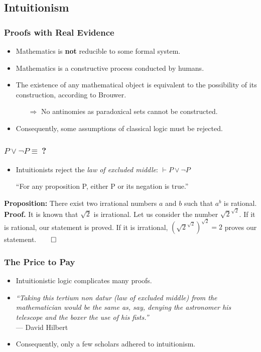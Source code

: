 \documentclass{beamer}
\begin{document}
\subsection{Intuitionism}
\begin{frame}
    \frametitle{Proofs with Real Evidence}
    \begin{itemize}[<+->]
	\item Mathematics is \textbf{not} reducible to some formal system.
	\item Mathematics is a constructive process conducted by humans.
	\item The existence of any mathematical object is equivalent to the possibility of its construction, according to Brouwer.
	\begin{itemize}
		\item[$\Rightarrow$] No antinomies as paradoxical sets cannot be constructed.
	\end{itemize}
	\item Consequently, some assumptions of classical logic must be rejected.
    \end{itemize}
\end{frame}
\begin{frame}
    \frametitle{$P\lor\lnot P\equiv\ $?}
    \begin{itemize}[<+->]
	\item Intuitionists reject the \textit{law of excluded middle}: $\vdash P\lor\lnot P$\\
		\begin{centering}
			``For any proposition P, either P or its negation is true.''
		\end{centering}
    \end{itemize}
	\pause[\thebeamerpauses]
	\textbf{Proposition:} There exist two irrational numbers $a$ and $b$ such that $a^b$ is rational.\\\pause
	\vspace{\baselineskip}
	\textbf{Proof.} It is known that $\sqrt{2}$ is irrational. Let us consider the number $\sqrt{2}^{\sqrt{2}}$.\pause$ $ If it is rational, our statement is proved.\pause$ $ If it is irrational, $(\sqrt{2}^{\sqrt{2}})^{\sqrt{2}}=2$ proves our statement.\hfill$\qed$
\end{frame}
\begin{frame}
    \frametitle{The Price to Pay}
    \begin{itemize}[<+->]
	\item Intuitionistic logic complicates many proofs.
	\item \textit{``Taking this tertium non datur (law of excluded middle) from the mathematician would be the same as, say, denying the astronomer his telescope and the boxer the use of his fists.''}\nocite{hilbert_tertium_non_datur}\\\hfill--- David Hilbert
	\item Consequently, only a few scholars adhered to intuitionism.
    \end{itemize}
\end{frame}
\end{document}
